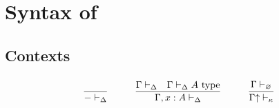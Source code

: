 \clearpage
\appendix

\section{Syntax of \GTT}
\newcommand{\type}{\text{ type}}
\newcommand{\poly}{\text{ code}}
\newcommand{\Nat}{\mathsf{Nat}}
\newcommand{\later}{\triangleright}
\newcommand{\suc}{\mathsf{S}}
\newcommand{\natrec}{\mathsf{natrec}}
\newcommand{\boxtm}{\mathsf{box}}
\newcommand{\unboxtm}{\mathsf{unbox}}
\newcommand{\fix}{\mathsf{fix}}
\newcommand{\next}{\mathsf{next}}
\newcommand{\force}{\mathsf{force}}
\newcommand{\up}{{\uparrow}}
\newcommand{\down}{{\downarrow}}
\subsection*{Contexts}
\[\arraycolsep=15pt\def\arraystretch{2.8}
\begin{array}{ccc}
\infer{- \vdash_{\Delta}}{} 
&
\infer{\Gamma, x : A \vdash_{\Delta}}{\Gamma \vdash_{\Delta} & \Gamma \vdash_{\Delta} A \type}
&
\infer{\Gamma \up \vdash_{\kappa} }{\Gamma \vdash_{\varnothing}}
\end{array}
\]

